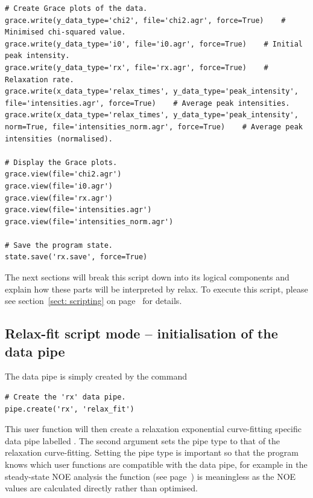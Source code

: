 \begin{lstlisting}
# Create Grace plots of the data.
grace.write(y_data_type='chi2', file='chi2.agr', force=True)    # Minimised chi-squared value.
grace.write(y_data_type='i0', file='i0.agr', force=True)    # Initial peak intensity.
grace.write(y_data_type='rx', file='rx.agr', force=True)    # Relaxation rate.
grace.write(x_data_type='relax_times', y_data_type='peak_intensity', file='intensities.agr', force=True)    # Average peak intensities.
grace.write(x_data_type='relax_times', y_data_type='peak_intensity', norm=True, file='intensities_norm.agr', force=True)    # Average peak intensities (normalised).

# Display the Grace plots.
grace.view(file='chi2.agr')
grace.view(file='i0.agr')
grace.view(file='rx.agr')
grace.view(file='intensities.agr')
grace.view(file='intensities_norm.agr')

# Save the program state.
state.save('rx.save', force=True)
\end{lstlisting}

The next sections will break this script down into its logical components and explain how these parts will be interpreted by relax.
To execute this script, please see section~\ref{sect: scripting} on page~\pageref{sect: scripting} for details.



\subsection{Relax-fit script mode -- initialisation of the data pipe} \label{Rx initialisation}

The data pipe is simply created by the command

\begin{lstlisting}[firstnumber=3]
# Create the 'rx' data pipe.
pipe.create('rx', 'relax_fit')
\end{lstlisting}

This user function will then create a relaxation exponential curve-fitting specific data pipe labelled .
The second argument sets the pipe type to that of the relaxation curve-fitting.
Setting the pipe type is important so that the program knows which user functions are compatible with the data pipe, for example in the steady-state NOE analysis the function  (see page~\pageref{uf: minimise.execute}) is meaningless as the NOE values are calculated directly rather than optimised.




